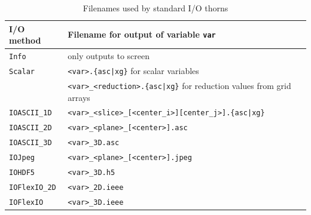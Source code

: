 \documentclass{article}
\begin{document}
\begin{table}[htb]
\begin{center}
\label{filename_table}
\begin{tabular}{|l|l|}
  \hline
  {\bf I/O method}   & {\bf Filename for output of variable {\tt var}}\\
  \hline
  {\tt Info}         & only outputs to screen\\
  {\tt Scalar}       & {\tt <var>.\{asc|xg\}} for scalar variables\\
                     & {\tt <var>\_<reduction>.\{asc|xg\}} for reduction values from grid arrays\\
  {\tt IOASCII\_1D}  & {\tt <var>\_<slice>\_[<center\_i>][center\_j>].\{asc|xg\}}\\
  {\tt IOASCII\_2D}  & {\tt <var>\_<plane>\_[<center>].asc}\\
  {\tt IOASCII\_3D}  & {\tt <var>\_3D.asc}\\
  {\tt IOJpeg}       & {\tt <var>\_<plane>\_[<center>].jpeg}\\
  {\tt IOHDF5}       & {\tt <var>\_3D.h5}\\
  {\tt IOFlexIO\_2D} & {\tt <var>\_2D.ieee}\\
  {\tt IOFlexIO}     & {\tt <var>\_3D.ieee}\\
  \hline
\end{tabular}
\caption{Filenames used by standard I/O thorns}
\end{center}
\end{table}

\end{document}
